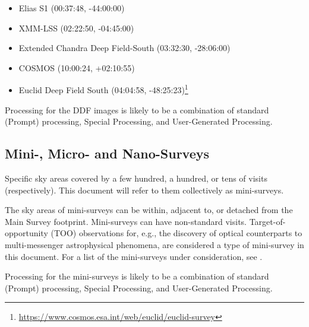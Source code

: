 \begin{itemize}
\item Elias S1 (00:37:48, -44:00:00)
\item XMM-LSS (02:22:50, -04:45:00)
\item Extended Chandra Deep Field-South (03:32:30, -28:06:00)
\item COSMOS (10:00:24, +02:10:55)
\item Euclid Deep Field South  (04:04:58, -48:25:23)\footnote{\url{https://www.cosmos.esa.int/web/euclid/euclid-survey}}
\end{itemize}

Processing for the DDF images is likely to be a combination of standard (Prompt) processing,
Special Processing, and User-Generated Processing.

\subsection{Mini-, Micro- and Nano-Surveys}

Specific sky areas covered by a few hundred, a hundred, or tens of visits (respectively).
This document will refer to them collectively as mini-surveys.

The sky areas of mini-surveys can be within, adjacent to, or detached from the Main Survey footprint.
Mini-surveys can have non-standard visits.
Target-of-opportunity (TOO) observations for, e.g., the discovery of optical counterparts to 
multi-messenger astrophysical phenomena, are considered a type of mini-survey in this document.
For a list of the mini-surveys under consideration,
see .

Processing for the mini-surveys is likely to be a combination of standard (Prompt) processing,
Special Processing, and User-Generated Processing.
